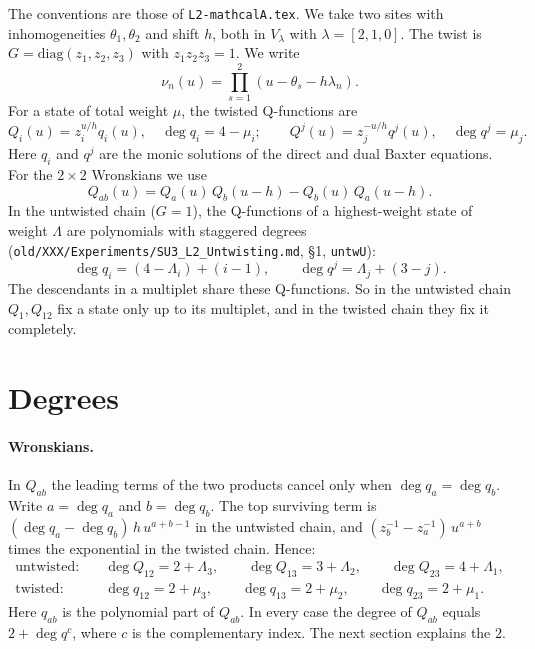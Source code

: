 \documentclass[11pt]{article}
\newcommand{\nb}[1]{\texttt{#1}}
\theoremstyle{definition}
\theoremstyle{remark}
\begin{document}
The conventions are those of \nb{L2-mathcalA.tex}. We take two sites with inhomogeneities $\theta_1,\theta_2$ and shift $h$, both in $V_\lambda$ with $\lambda=[2,1,0]$. The twist is $G=\mathrm{diag}(z_1,z_2,z_3)$ with $z_1z_2z_3=1$. We write
\begin{equation}
\nu_n(u)=\prod_{s=1}^2(u-\theta_s-h\lambda_n).
\end{equation}
For a state of total weight $\mu$, the twisted Q-functions are
\begin{equation}
Q_i(u)=z_i^{u/h}q_i(u),\quad \deg q_i=4-\mu_i;\qquad Q^j(u)=z_j^{-u/h}q^j(u),\quad \deg q^j=\mu_j .
\end{equation}
Here $q_i$ and $q^j$ are the monic solutions of the direct and dual Baxter equations. For the $2\times2$ Wronskians we use
\begin{equation}
Q_{ab}(u)=Q_a(u)\,Q_b(u-h)-Q_b(u)\,Q_a(u-h).
\end{equation}
In the untwisted chain ($G=1$), the Q-functions of a highest-weight state of weight $\Lambda$ are polynomials with staggered degrees (\nb{old/XXX/Experiments/SU3\_L2\_Untwisting.md}, \S1, \nb{untwU}):
\begin{equation}\label{eq:stagger}
\deg q_i=(4-\Lambda_i)+(i-1),\qquad \deg q^j=\Lambda_j+(3-j).
\end{equation}
The descendants in a multiplet share these Q-functions. So in the untwisted chain $Q_1,Q_{12}$ fix a state only up to its multiplet, and in the twisted chain they fix it completely.

\section{Degrees}

\paragraph{Wronskians.} In $Q_{ab}$ the leading terms of the two products cancel only when $\deg q_a=\deg q_b$. Write $a=\deg q_a$ and $b=\deg q_b$. The top surviving term is $(\deg q_a-\deg q_b)\,h\,u^{a+b-1}$ in the untwisted chain, and $(z_b^{-1}-z_a^{-1})\,u^{a+b}$ times the exponential in the twisted chain. Hence:
\begin{align}
\text{untwisted:}\quad &\deg Q_{12}=2+\Lambda_3,\qquad \deg Q_{13}=3+\Lambda_2,\qquad \deg Q_{23}=4+\Lambda_1,\\
\text{twisted:}\quad &\deg q_{12}=2+\mu_3,\qquad \deg q_{13}=2+\mu_2,\qquad \deg q_{23}=2+\mu_1 .
\end{align}
Here $q_{ab}$ is the polynomial part of $Q_{ab}$. In every case the degree of $Q_{ab}$ equals $2+\deg q^c$, where $c$ is the complementary index. The next section explains the $2$.
\end{document}
